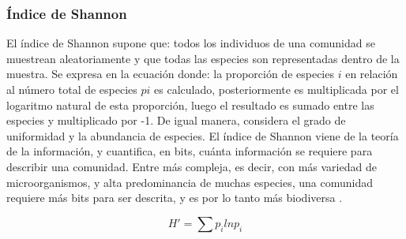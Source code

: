 \documentclass[12pt,letterpaper,oneside]{report}
\begin{document}
\subsubsection{Índice de Shannon}
El índice de Shannon supone que: todos los individuos de una comunidad se muestrean aleatoriamente y que todas las especies son representadas dentro de la muestra. Se expresa en la ecuación donde: la proporción de especies \(i\) en relación al número total de especies \(pi\) es calculado, posteriormente es multiplicada por el logaritmo natural de esta proporción, luego el resultado es sumado entre las especies y multiplicado por -1. De igual manera, considera el grado de uniformidad y la abundancia de especies. El índice de Shannon viene de la teoría de la información, y cuantifica, en bits, cuánta información se requiere para describir una comunidad. Entre más compleja, es decir, con más variedad de microorganismos, y alta predominancia de muchas especies, una comunidad requiere más bits para ser descrita, y es por lo tanto más biodiversa \autocite{Tuomisto2010a}.
\begin{large}
\[H'=\sum p_i ln p_i\]
\end{large}
\end{document}
